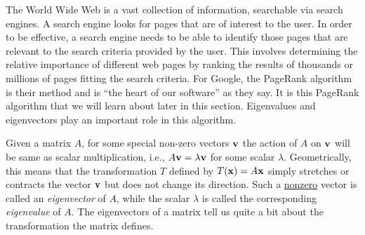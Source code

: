  \label{chap:intro_eigenvals_eigenvects}

\vspace*{-17 pt}

\vspace*{13 pt}

\label{sec:appl_pagerank}
The World Wide Web is a vast collection of information, searchable via search engines. A search engine looks for pages that are of interest to the user. In order to be effective, a search engine needs to be able to identify those pages that are relevant to the search criteria provided by the user. This involves determining the relative importance of different web pages by ranking the results of thousands or millions of pages fitting the search criteria. For Google, the PageRank algorithm is their method and is ``the heart of our software'' as they say. It is this PageRank algorithm that we will learn about later in this section. Eigenvalues and eigenvectors play an important role in this algorithm.

\label{sec:eigen_intro}

Given a matrix $A$, for some special non-zero vectors $\mathbf{v}$ the action of $A$ on $\mathbf{v}$ will be same as scalar multiplication, i.e., $A\mathbf{v}=\lambda \mathbf{v}$ for some scalar $\lambda$. Geometrically, this means that the transformation $T$ defined by $T(\mathbf{x}) = A\mathbf{x}$ simply stretches or contracts the vector $\mathbf{v}$ but does not change its direction. Such a \underline{nonzero} vector is called an \emph{eigenvector} of $A$, while the scalar $\lambda$ is called the corresponding \emph{eigenvalue} of $A$. The eigenvectors of a matrix tell us quite a bit about the transformation the matrix defines. 

